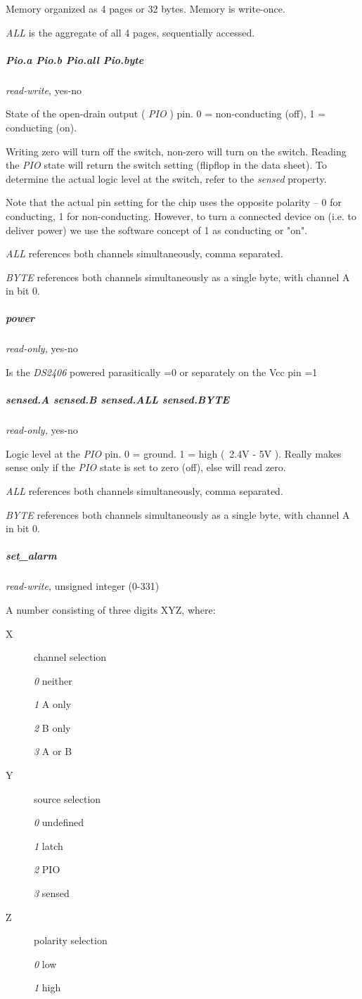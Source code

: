 Memory organized as 4 pages or 32 bytes. Memory is write-once. 

\textit{ALL} is the aggregate of all 4 pages, sequentially accessed. 
\subparagraph*{Pio.a Pio.b Pio.all
Pio.byte}\textit{read-write,} yes-no 

State of the open-drain output ( \textit{PIO} ) pin. 0 = non-conducting (off), 1 =
\textsf{conducting (on)}. 

Writing zero will turn off the switch, non-zero will turn on the switch.
Reading the \textit{PIO} state will return the switch setting (flipflop in the data
sheet). To determine the actual logic level at the switch, refer to the
\textit{sensed} property. 

Note that the actual pin setting for the chip uses the opposite polarity
-- 0 for conducting, 1 for non-conducting. However, to turn a connected device
on (i.e. to deliver power) we use the software concept of 1 as conducting
or "on". 

\textit{ALL} references both channels simultaneously, comma separated. 

\textit{BYTE} references both channels simultaneously as a single byte, with channel
A in bit 0. 
\subparagraph*{power}\textit{read-only,} yes-no 

Is the \textit{DS2406} powered parasitically =0 or separately on the Vcc pin =1

\subparagraph*{sensed.A sensed.B sensed.ALL sensed.BYTE}\textit{read-only,} yes-no 

Logic level at the \textit{PIO} pin. 0 = ground. 1 = high (~2.4V - 5V ). Really makes
sense only if the \textit{PIO} state is set to zero (off), else will read zero. 

\textit{ALL} references both channels simultaneously, comma separated. 

\textit{BYTE} references both channels simultaneously as a single byte, with channel
A in bit 0. 
\subparagraph*{set\_alarm}\textit{read-write,} unsigned integer (0-331) 

A number consisting of three digits XYZ, where: \begin{description}
\item [X ] channel selection 

\textit{0} neither 

\textit{1} A only 

\textit{2} B only 

\textit{3} A or B 
\item [Y ] source selection 

\textit{0} undefined 

\textit{1} latch 

\textit{2} PIO 

\textit{3} sensed 
\item [Z ] polarity selection 

\textit{0} low 

\textit{1} high 
\end{description}


